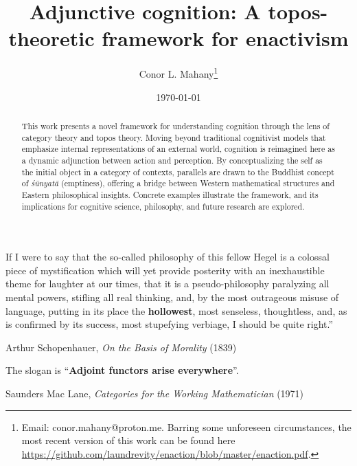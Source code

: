 \documentclass{article}
\title{Adjunctive cognition: A topos-theoretic framework for enactivism}
\author{Conor L. Mahany\footnote{
    Email: conor.mahany@proton.me. Barring some unforeseen circumstances, the most recent version of this work can be found here \href{https://github.com/laundrevity/enaction/blob/master/enaction.pdf}{https://github.com/laundrevity/enaction/blob/master/enaction.pdf}.
}}
\date{\today}
\begin{document}
\maketitle

\begin{abstract}
    This work presents a novel framework for understanding cognition through the lens of category theory and topos theory. Moving beyond traditional cognitivist models that emphasize internal representations of an external world, cognition is reimagined here as a dynamic adjunction between action and perception. By conceptualizing the self as the initial object in a category of contexts, parallels are drawn to the Buddhist concept of \emph{śūnyatā} (emptiness), offering a bridge between Western mathematical structures and Eastern philosophical insights. Concrete examples illustrate the framework, and its implications for cognitive science, philosophy, and future research are explored.
\end{abstract}

\newpage

\begin{customquote}
    If I were to say that the so-called philosophy of this fellow Hegel is a colossal piece of mystification which will yet provide posterity with an inexhaustible theme for laughter at our times, that it is a pseudo-philosophy paralyzing all mental powers, stifling all real thinking, and, by the most outrageous misuse of language, putting in its place the \textbf{hollowest}, most senseless, thoughtless, and, as is confirmed by its success, most stupefying verbiage, I should be quite right.” \\
    \begin{center}
        Arthur Schopenhauer, \emph{On the Basis of Morality} (1839)
    \end{center}
\end{customquote}

\vspace{10px} %

\begin{customquote}
    The slogan is ``\textbf{Adjoint functors arise everywhere}''. \\
    \begin{center}
        Saunders Mac Lane, \emph{Categories for the Working Mathematician} (1971)
    \end{center}
\end{customquote}
\end{document}
